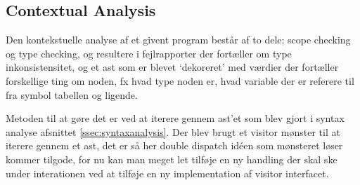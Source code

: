 \subsection{Contextual Analysis}\wip\label{ssec:contextual}
    Den kontekstuelle analyse af et givent program består af to dele; scope checking og type checking, og resultere i fejlrapporter der fortæller om type inkonsistensitet, og et \gls{ast} som er blevet \enquote*{dekoreret} med værdier der fortæller forskellige ting om noden, fx hvad type noden er, hvad variable der er referere til fra symbol tabellen og ligende. %
    
    Metoden til at gøre det er ved at iterere gennem \gls{ast}'et som blev gjort i syntax analyse afsnittet \ref{ssec:syntaxanalysis}. Der blev brugt et visitor mønster til at iterere gennem et \gls{ast}, det er så her double dispatch idéen som mønsteret løser kommer tilgode, for nu kan man meget let tilføje en ny handling der skal ske under interationen ved at tilføje en ny implementation af visitor interfacet.